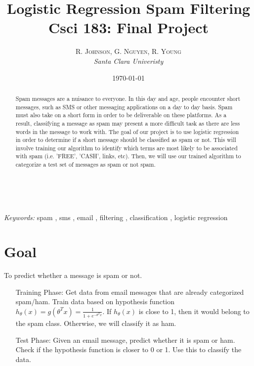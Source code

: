 \documentclass[12pt]{article} %
\title{\textbf{Logistic Regression Spam Filtering}\\ %
Csci 183: Final Project} %
\author{\textsc{R. Johnson, G. Nguyen, R. Young} %
\\{\textit{Santa Clara Univeristy}}} %
\date{\today} %
\makeatletter
\renewcommand{\maketitle}{ %
  \begin{flushright}


	{\LARGE\@title} %

	\vspace{50pt} %

	{\large\@author} %
	\\\@date %

	\vspace{40pt} %
\end{flushright}
}
\makeatother
\begin{document}
\maketitle %



\begin{abstract}
Spam messages are a nuisance to everyone. In this day and age, people encounter short messages, such as SMS or other messaging applications on a day to day basis.  Spam must also take on a short form in order to be deliverable on these platforms.  As a result, classifying a  message as spam may present a more difficult task as there are less words in the message to work with.  The goal of our project is to use logistic regression in order to determine if a short message should be classified as spam or not. This will involve training our algorithm to identify which terms are most likely to be associated with spam (i.e. 'FREE', 'CASH', links, etc). Then, we will use our trained algorithm to categorize a test set of messages as spam or not spam.
\end{abstract}

\hspace*{3,6mm}\textit{Keywords:} spam , sms , email , filtering , classification , logistic regression %

\vspace{10pt} %

\section*{Goal}

To predict whether a message is spam or not.
\begin{enumerate}
	\item[Training Phase:] Get data from email messages that are already categorized spam/ham. Train data based on hypothesis function $h_\theta(x)=g(\theta^Tx) = \frac{1}{1+e^{-\theta^Tx}}$. If $h_\theta(x)$ is close to 1, then it would belong to the spam class. Otherwise, we will classify it as ham.
	\item[Test Phase:] Given an email message, predict whether it is spam or ham. Check if the hypothesis function is closer to 0 or 1. Use this to classify the data.
\end{enumerate}
\end{document}
